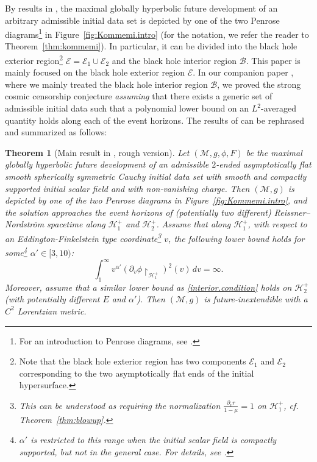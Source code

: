 \documentclass[10pt, reqno]{amsart}
\newtheorem{theorem}{Theorem}[section]
\theoremstyle{definition}
\theoremstyle{remark}
\theoremstyle{conjecture}
\numberwithin{equation}{section}
\newcommand{\rd}{\partial}
\newcommand{\0}{\emptyset}
\newcommand{\alp}{\alpha}
\newcommand{\calH}{\mathcal H}
\newcommand{\f}{\frac}
\newcommand{\EH}{\calH^{+}}
\newcommand{\Int}{\mathscr{B}}
\newcommand{\Ext}{\mathscr{E}}
\begin{document}
By results in \cite{Kommemi, D3}, the maximal globally hyperbolic future development of an arbitrary admissible initial data set is depicted by one of the two Penrose diagrams\footnote{For an introduction to Penrose diagrams, see \cite[Appendix~C]{DRPL}.} in Figure~\ref{fig:Kommemi.intro} (for the notation, we refer the reader to Theorem~\ref{thm:kommemi}). In particular, it can be divided into the black hole exterior region\footnote{Note that the black hole exterior region has two components $\Ext_{1}$ and $\Ext_{2}$ corresponding to the two asymptotically flat ends of the initial hypersurface.} $\Ext = \Ext_{1} \cup \Ext_{2}$ and the black hole interior region $\Int$. This paper is mainly focused on the black hole exterior region $\Ext$. In our companion paper \cite{LO.interior}, where we mainly treated the black hole interior region $\Int$, we proved the strong cosmic censorship conjecture \emph{assuming} that there exists a generic set of admissible initial data such that a polynomial lower bound on an $L^2$-averaged quantity holds along each of the event horizons. The results of \cite{LO.interior} can be rephrased and summarized as follows:

\begin{theorem}[Main result in \cite{LO.interior}, rough version]\label{main.result.interior}
Let $(\mathcal M, g, \phi, F)$ be the maximal globally hyperbolic future development of an admissible $2$-ended asymptotically flat smooth spherically symmetric Cauchy initial data set with smooth and compactly supported initial scalar field and with non-vanishing charge. Then $(\mathcal M, g)$ is depicted by one of the two Penrose diagrams in Figure~\ref{fig:Kommemi.intro}, and the solution approaches the event horizons of (potentially two different) Reissner--Nordstr\"om spacetime along $\EH_1$ and $\EH_2$. Assume that along $\EH_1$, with respect to an Eddington-Finkelstein type coordinate\footnote{This can be understood as requiring the normalization $\f{\rd_v r}{1-\mu}=1$ on $\EH_1$, cf. Theorem~\ref{thm:blowup}.} $v$, the following lower bound holds for some\footnote{$\alp'$ is restricted to this range when the initial scalar field is compactly supported, but not in the general case. For details, see \cite{LO.interior}.} $\alp'\in [3, 10)$:
\begin{equation}\label{interior.condition}
\int_1^\infty v^{\alp'}(\rd_v\phi\restriction_{\EH_1})^2(v)\, dv =\infty.
\end{equation}
Moreover, assume that a similar lower bound as \eqref{interior.condition} holds on $\EH_2$ (with potentially different $E$ and $\alp'$).
Then $(\mathcal M, g)$ is future-inextendible with a $C^2$ Lorentzian metric.
\end{theorem}
\end{document}
